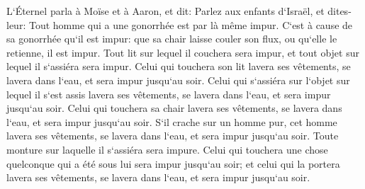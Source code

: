 \verse L`Éternel parla à Moïse et à Aaron, et dit: 
\verse Parlez aux enfants d`Israël, et dites-leur: Tout homme qui a une gonorrhée est par là même impur. 
\verse C`est à cause de sa gonorrhée qu`il est impur: que sa chair laisse couler son flux, ou qu`elle le retienne, il est impur. 
\verse Tout lit sur lequel il couchera sera impur, et tout objet sur lequel il s`assiéra sera impur. 
\verse Celui qui touchera son lit lavera ses vêtements, se lavera dans l`eau, et sera impur jusqu`au soir. 
\verse Celui qui s`assiéra sur l`objet sur lequel il s`est assis lavera ses vêtements, se lavera dans l`eau, et sera impur jusqu`au soir. 
\verse Celui qui touchera sa chair lavera ses vêtements, se lavera dans l`eau, et sera impur jusqu`au soir. 
\verse S`il crache sur un homme pur, cet homme lavera ses vêtements, se lavera dans l`eau, et sera impur jusqu`au soir. 
\verse Toute monture sur laquelle il s`assiéra sera impure. 
\verse Celui qui touchera une chose quelconque qui a été sous lui sera impur jusqu`au soir; et celui qui la portera lavera ses vêtements, se lavera dans l`eau, et sera impur jusqu`au soir. 
